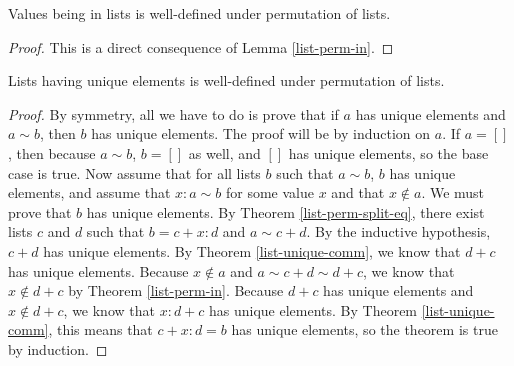 \documentclass[../math.tex]{subfiles}
\begin{document}
\begin{lemma}
    Values being in lists is well-defined under permutation of lists.
\end{lemma}
\begin{proof}
    This is a direct consequence of Lemma \ref{list-perm-in}.
\end{proof}

\begin{lemma}
    Lists having unique elements is well-defined under permutation of lists.
\end{lemma}
\begin{proof}
    By symmetry, all we have to do is prove that if $a$ has unique elements and
    $a \sim b$, then $b$ has unique elements.  The proof will be by induction on
    $a$.  If $a = []$, then because $a \sim b$, $b = []$ as well, and $[]$ has
    unique elements, so the base case is true.  Now assume that for all lists
    $b$ such that $a \sim b$, $b$ has unique elements, and assume that $x : a
    \sim b$ for some value $x$ and that $x \notin a$.  We must prove that $b$
    has unique elements.  By Theorem \ref{list-perm-split-eq}, there exist lists
    $c$ and $d$ such that $b = c + x : d$ and $a \sim c + d$.  By the inductive
    hypothesis, $c + d$ has unique elements.  By Theorem \ref{list-unique-comm},
    we know that $d + c$ has unique elements.  Because $x \notin a$ and $a \sim
    c + d \sim d + c$, we know that $x \notin d + c$ by Theorem
    \ref{list-perm-in}.  Because $d + c$ has unique elements and $x \notin d +
    c$, we know that $x : d + c$ has unique elements.  By Theorem
    \ref{list-unique-comm}, this means that $c + x : d = b$ has unique elements,
    so the theorem is true by induction.
\end{proof}
\end{document}
